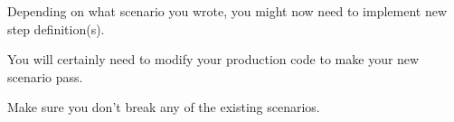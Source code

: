     Depending on what scenario you wrote, you might now need to implement new step definition(s). 
    
    You will certainly need to modify your production code to make your new scenario pass. 
    
    Make sure you don't break any of the existing scenarios.
    
    
\fi